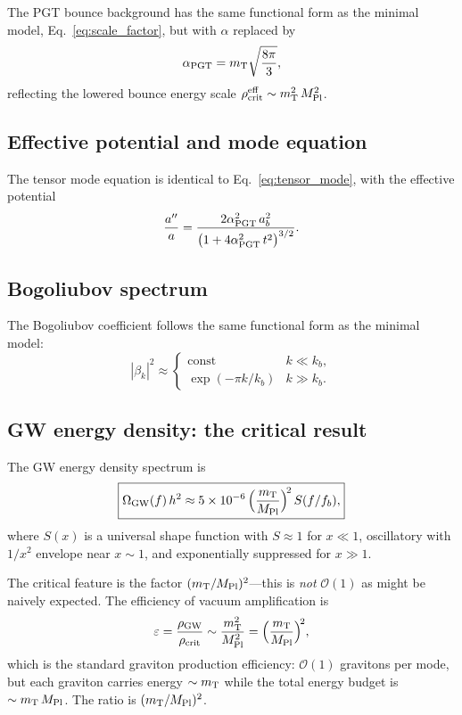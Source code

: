\documentclass[aps,prd,twocolumn,superscriptaddress,showpacs,preprintnumbers,
  nofootinbib,longbibliography,floatfix]{revtex4-2}
\newcommand{\rhocrit}{\rho_{\rm crit}}
\newcommand{\MPl}{M_{\rm Pl}}
\newcommand{\OmGW}{\Omega_{\rm GW}}
\newcommand{\mT}{m_{\rm T}}
\begin{document}
The PGT bounce background has the same functional form as the minimal
model, Eq.~\eqref{eq:scale_factor}, but with $\alpha$ replaced by
\begin{equation}\label{eq:alpha_pgt}
  \alpha_{\rm PGT} = \mT\sqrt{\frac{8\pi}{3}},
\end{equation}
reflecting the lowered bounce energy scale $\rhocrit^{\rm eff} \sim
\mT^2\,\MPl^2$.

\subsection{Effective potential and mode equation}

The tensor mode equation is identical to Eq.~\eqref{eq:tensor_mode},
with the effective potential
\begin{equation}\label{eq:Veff_pgt}
  \frac{a''}{a} = \frac{2\alpha_{\rm PGT}^2\,a_b^2}
  {\bigl(1 + 4\alpha_{\rm PGT}^2\,t^2\bigr)^{3/2}}.
\end{equation}

\subsection{Bogoliubov spectrum}

The Bogoliubov coefficient follows the same functional form as the
minimal model:
\begin{equation}\label{eq:beta_pgt}
  |\beta_k|^2 \approx
  \begin{cases}
    \text{const} & k \ll k_b, \\
    \exp(-\pi k/k_b) & k \gg k_b.
  \end{cases}
\end{equation}

\subsection{GW energy density: the critical result}

The GW energy density spectrum is
\begin{equation}\label{eq:OmGW}
  \boxed{\OmGW(f)\,h^2 \approx 5\times 10^{-6}\,
  \Bigl(\frac{\mT}{\MPl}\Bigr)^{\!2}\,S(f/f_b),}
\end{equation}
where $S(x)$ is a universal shape function with $S \approx 1$ for $x \ll
1$, oscillatory with $1/x^2$ envelope near $x \sim 1$, and exponentially
suppressed for $x \gg 1$.

The critical feature is the factor $(\mT/\MPl)^2$---this is \textit{not}
$\mathcal{O}(1)$ as might be naively expected. The efficiency of vacuum
amplification is
\begin{equation}\label{eq:efficiency}
  \varepsilon = \frac{\rho_{\rm GW}}{\rhocrit} \sim
  \frac{\mT^2}{\MPl^2} = \Bigl(\frac{\mT}{\MPl}\Bigr)^{\!2},
\end{equation}
which is the standard graviton production efficiency: $\mathcal{O}(1)$
gravitons per mode, but each graviton carries energy $\sim \mT$ while
the total energy budget is $\sim \mT\,\MPl$. The ratio is $(\mT/\MPl)^2$.
\end{document}
